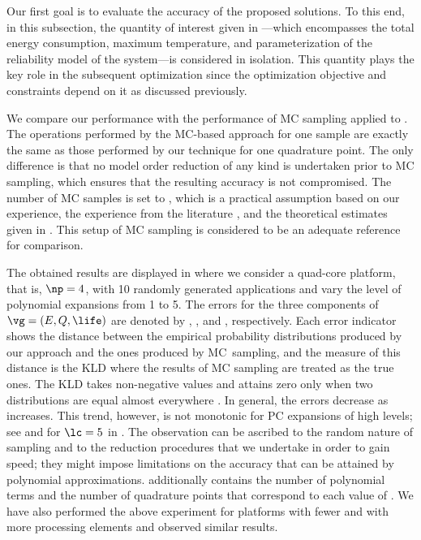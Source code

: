 Our first goal is to evaluate the accuracy of the proposed solutions. To this
end, in this subsection, the quantity of interest given in
---which encompasses the total energy
consumption, maximum temperature, and parameterization of the reliability model
of the system---is considered in isolation. This quantity plays the key role in
the subsequent optimization since the optimization objective and constraints
depend on it as discussed previously.

We compare our performance with the performance of \ac{MC} sampling applied to
. The operations performed by the
\ac{MC}-based approach for one sample are exactly the same as those performed by
our technique for one quadrature point. The only difference is that no model
order reduction of any kind is undertaken prior to \ac{MC} sampling, which
ensures that the resulting accuracy is not compromised. The number of \ac{MC}
samples is set to , which is a practical assumption based on our
experience, the experience from the literature \cite{xiang2010, juan2012,
lee2013}, and the theoretical estimates given in \cite{diaz-emparanza2002}. This
setup of \ac{MC} sampling is considered to be an adequate reference for
comparison.

The obtained results are displayed in  where
we consider a quad-core platform, that is, $\np = 4$, with 10 randomly generated
applications and vary the level of polynomial expansions \lc from 1 to 5. The
errors for the three components of $\vg = (E, Q, \life)$ are denoted by
, , and \error{\life}, respectively. Each error indicator
shows the distance between the empirical probability distributions produced by
our approach and the ones produced by \ac{MC}\ sampling, and the measure of this
distance is the \ac{KLD} \cite{gelman2013, hastie2013} where the results of
\ac{MC} sampling are treated as the true ones. The \ac{KLD} takes non-negative
values and attains zero only when two distributions are equal almost everywhere
\cite{durrett2010}. In general, the errors decrease as \lc increases. This
trend, however, is not monotonic for \ac{PC} expansions of high levels; see
 and \error{\life} for $\lc = 5$ in .
The observation can be ascribed to the random nature of sampling and to the
reduction procedures that we undertake in order to gain speed; they might impose
limitations on the accuracy that can be attained by polynomial approximations.
 additionally contains the number of
polynomial terms \nc and the number of quadrature points \nq that correspond to
each value of \lc. We have also performed the above experiment for platforms
with fewer and with more processing elements and observed similar results.

